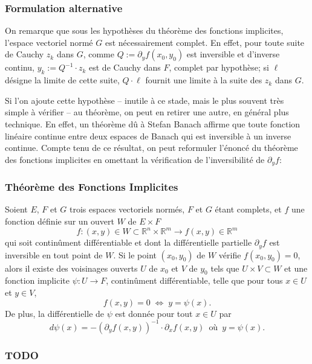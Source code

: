 \documentclass[french,]{article}
\begin{document}
\hypertarget{formulation-alternative}{%
\subsubsection{Formulation alternative}\label{formulation-alternative}}

On remarque que sous les hypothèses du théorème des fonctions
implicites, l'espace vectoriel normé \(G\) est nécessairement complet.
En effet, pour toute suite de Cauchy \(z_k\) dans \(G\), comme
\(Q := \partial_y f(x_0, y_0)\) est inversible et d'inverse continu,
\(y_k := Q^{-1} \cdot z_k\) est de Cauchy dans \(F\), complet par
hypothèse; si \(\ell\) désigne la limite de cette suite,
\(Q \cdot \ell\) fournit une limite à la suite des \(z_k\) dans \(G\).

Si l'on ajoute cette hypothèse -- inutile à ce stade, mais le plus
souvent très simple à vérifier -- au théorème, on peut en retirer une
autre, en général plus technique. En effet, un théorème dû à Stefan
Banach affirme que toute fonction linéaire continue entre deux espaces
de Banach qui est inversible à un inverse continue. Compte tenu de ce
résultat, on peut reformuler l'énoncé du théorème des fonctions
implicites en omettant la vérification de l'inversibilité de
\(\partial_y f\):

\hypertarget{TFI-2-alt}{%
\subsubsection{Théorème des Fonctions Implicites}\label{TFI-2-alt}}

Soient \(E\), \(F\) et \(G\) trois espaces vectoriels normés, \(F\) et
\(G\) étant complets, et \(f\) une fonction définie sur un ouvert \(W\)
de \(E \times F\) \[
f: (x, y) \in W \subset \mathbb{R}^n \times \mathbb{R}^m \to f(x, y) \in \mathbb{R}^m
\] qui soit continûment différentiable et dont la différentielle
partielle \(\partial_y f\) est inversible en tout point de \(W\). Si le
point \((x_0, y_0)\) de \(W\) vérifie \(f(x_0, y_0)= 0\), alors il
existe des voisinages ouverts \(U\) de \(x_0\) et \(V\) de \(y_0\) tels
que \(U \times V \subset W\) et une fonction implicite
\(\psi: U \to F\), continûment différentiable, telle que pour tous
\(x \in U\) et \(y \in V\), \[
f(x, y) = 0
\; \Leftrightarrow \; 
y = \psi(x).
\] De plus, la différentielle de \(\psi\) est donnée pour tout
\(x \in U\) par \[
d \psi(x) = - (\partial_y f(x, y))^{-1} \cdot \partial_x f(x, y) \, \mbox{ où } \, y=\psi(x).
\]

\hypertarget{todo-1}{%
\subsubsection{TODO}\label{todo-1}}
\end{document}
